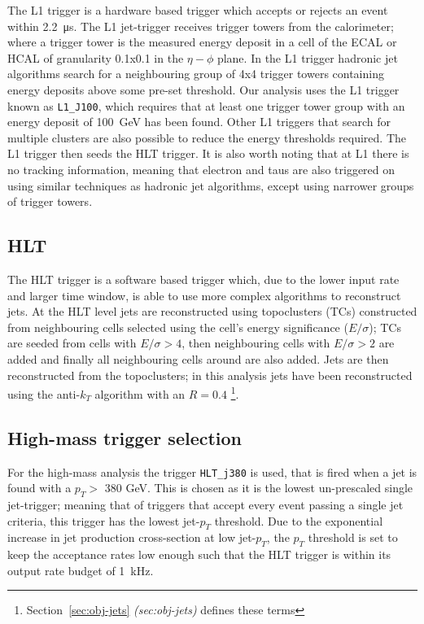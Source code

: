The L1 trigger is a hardware based trigger which accepts or rejects an event within \SI{2.2}{\micro\second}.
The L1 jet-trigger receives trigger towers from the calorimeter;
where a trigger tower is the measured energy deposit in a cell of the ECAL or HCAL of granularity 0.1x0.1 in the $\eta-\phi$ plane.
In the L1 trigger hadronic jet algorithms search for a neighbouring group of 4x4 trigger towers containing energy deposits above some pre-set threshold.
Our analysis uses the L1 trigger known as \verb|L1_J100|, which requires that at least one trigger tower group with an energy deposit of \SI{100}{\GeV} has been found.
Other L1 triggers that search for multiple clusters are also possible to reduce the energy thresholds required.
The L1 trigger then seeds the HLT trigger.
It is also worth noting that at L1 there is no tracking information, meaning that electron and taus
are also triggered on using similar techniques as hadronic jet algorithms, except using narrower groups of trigger towers.


\subsection{HLT}

The HLT trigger is a software based trigger which, due to the lower input rate and larger time window,
is able to use more complex algorithms to reconstruct jets.
At the HLT level jets are reconstructed using topoclusters (TCs) constructed from neighbouring cells selected using the cell's energy significance ($E/\sigma$);
TCs are seeded from cells with $E/\sigma > 4$, then neighbouring cells with $E/\sigma > 2$ are added
and finally all neighbouring cells around are also added.
Jets are then reconstructed from the topoclusters;
in this analysis jets have been reconstructed using
the anti-$k_T$ algorithm with an $R = 0.4$ \footnote{Section~\ref{sec:obj-jets} \textit{(sec:obj-jets)} defines these terms}. 

\subsection{High-mass trigger selection}

For the high-mass analysis the trigger \verb|HLT_j380| is used, that is fired when a jet is found with a $p_T >$ 380 GeV.
This is chosen as it is the lowest un-prescaled single jet-trigger;
meaning that of triggers that accept every event passing a single jet criteria,
this trigger has the lowest jet-$p_T$ threshold.
Due to the exponential increase in jet production cross-section at low jet-$p_T$,
the $p_T$ threshold is set to keep the acceptance rates low enough such that the HLT trigger is within its output rate budget of 1~kHz.

